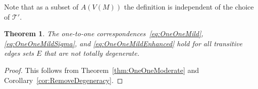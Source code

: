 \documentclass[11pt]{amsart}
\theoremstyle{plain}
\newtheorem{theorem}{Theorem}[section]
\theoremstyle{definition}
\newtheorem{lemma}[theorem]{Lemma}
\newtheorem{corollary}[theorem]{Corollary}
\numberwithin{equation}{section}
\newcommand{\T}{\mathcal T}
\begin{document}
Note that as a subset of $A(V(M))$ the definition is independent of the choice of $\T'$.
%


\begin{theorem}\label{thm:OneOneWild}
The one-to-one correspondences~\eqref{eq:OneOneMild}, \eqref{eq:OneOneMildSigma}, and \eqref{eq:OneOneMildEnhanced} hold for all transitive edges sets $E$ that are not totally degenerate.
\end{theorem}
\begin{proof}
This follows from Theorem~\ref{thm:OneOneModerate} and Corollary~\ref{cor:RemoveDegeneracy}.
\end{proof}
\end{document}
